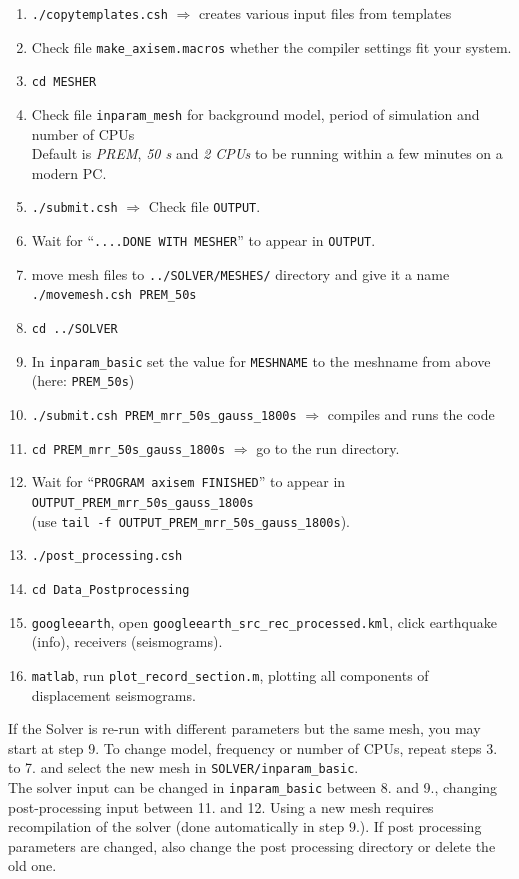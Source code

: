 \documentclass{article}
\begin{document}
\begin{enumerate}
    \item \verb|./copytemplates.csh| $\Rightarrow$ creates various input files from templates
    \item Check file \verb|make_axisem.macros| whether the compiler settings fit your
          system.
    \item \verb|cd MESHER|
    \item Check file {\tt inparam\_mesh} for background model, period of simulation and
          number of CPUs \\
          Default is \textit{PREM}, \textit{50 s} and \textit{2 CPUs} to be running within a
          few minutes on a modern PC.
    \item \verb|./submit.csh| $\Rightarrow$ Check file {\tt OUTPUT}.
    \item Wait for ``{\tt ....DONE WITH MESHER}'' to appear in {\tt OUTPUT}.
    \item move mesh files to \verb|../SOLVER/MESHES/| directory and give it a name
          \verb|./movemesh.csh PREM_50s|
    \item \verb|cd ../SOLVER|
    \item In \verb|inparam_basic| set the value for \verb|MESHNAME| to the meshname from
          above (here: \verb|PREM_50s|)
    \item \verb|./submit.csh PREM_mrr_50s_gauss_1800s|  $\Rightarrow$ compiles and runs
          the code
    \item \verb|cd PREM_mrr_50s_gauss_1800s| $\Rightarrow$ go to the run directory.
    \item Wait for ``\verb|PROGRAM axisem FINISHED|'' to appear in
          \verb|OUTPUT_PREM_mrr_50s_gauss_1800s| \\
          (use \verb|tail -f OUTPUT_PREM_mrr_50s_gauss_1800s|).
    \item \verb|./post_processing.csh|
    \item \verb|cd Data_Postprocessing|
    \item \verb|googleearth|, open {\tt googleearth\_src\_rec\_processed.kml}, click
            earthquake (info), receivers (seismograms).
    \item {\tt matlab}, run {\tt plot\_record\_section.m}, plotting all components
            of displacement seismograms.

\end{enumerate}
If the Solver is re-run with different parameters but the same mesh, you may start at step 9.
To change model, frequency or number of CPUs, repeat steps 3. to 7. and select the new
mesh in \verb|SOLVER/inparam_basic|. \\
The solver input can be changed in \verb|inparam_basic| between 8. and 9.,
changing post-processing input between 11. and 12. Using a new mesh requires
recompilation of the solver (done automatically in step 9.). If post
processing parameters are changed, also change the post processing directory or
delete the old one.
\end{document}
